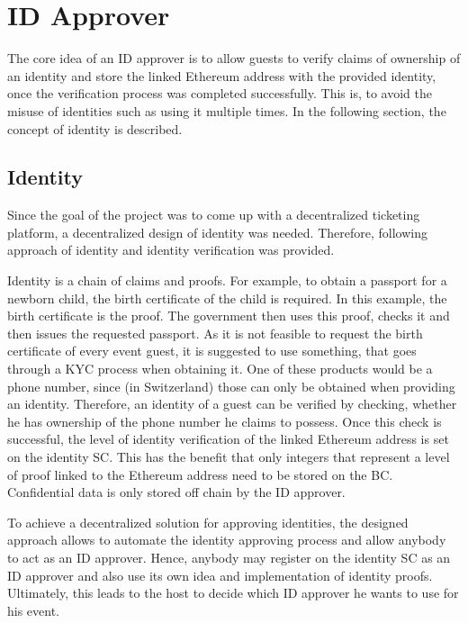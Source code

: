 \section{ID Approver}\label{section:id-approver-design}

The core idea of an ID approver is to allow guests to verify claims of ownership of an identity and store the linked Ethereum address with the provided identity, once the verification process was completed successfully. This is, to avoid the misuse of identities such as using it multiple times. In the following section, the concept of identity is described.

\subsection{Identity}\label{design:identity}
Since the goal of the project was to come up with a decentralized ticketing platform, a decentralized design of identity was needed. Therefore, following approach of identity and identity verification was provided.

Identity is a chain of claims and proofs. For example, to obtain a passport for a newborn child, the birth certificate of the child is required. In this example, the birth certificate is the proof. The government then uses this proof, checks it and then issues the requested passport. As it is not feasible to request the birth certificate of every event guest, it is suggested to use something, that goes through a KYC process when obtaining it. One of these products would be a phone number, since (in Switzerland) those can only be obtained when providing an identity. Therefore, an identity of a guest can be verified by checking, whether he has ownership of the phone number he claims to possess. Once this check is successful, the level of identity verification of the linked Ethereum address is set on the identity SC. This has the benefit that only integers that represent a level of proof linked to the Ethereum address need to be stored on the BC. Confidential data is only stored off chain by the ID approver.

To achieve a decentralized solution for approving identities, the designed approach allows to automate the identity approving process and allow anybody to act as an ID approver. Hence, anybody may register on the identity SC as an ID approver and also use its own idea and implementation of identity proofs.
Ultimately, this leads to the host to decide which ID approver he wants to use for his event.

